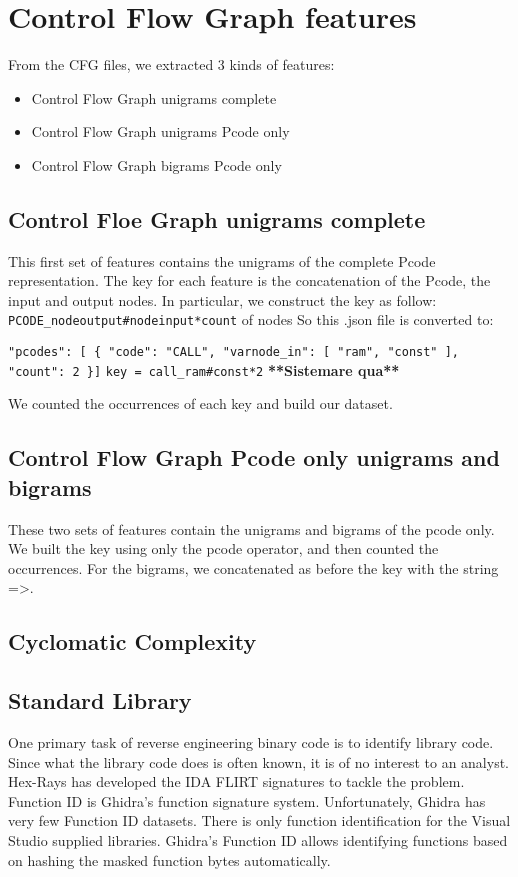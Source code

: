 \section{Control Flow Graph features}
From the CFG files, we extracted 3 kinds of features:
\begin{itemize}
	\item {Control Flow Graph unigrams complete}
	\item {Control Flow Graph unigrams Pcode only}
	\item {Control Flow Graph bigrams Pcode only}
\end{itemize}

\subsection{Control Floe Graph unigrams complete}
This first set of features contains the unigrams of the complete Pcode representation. The key for each feature is the concatenation of the Pcode, the input and output nodes. In particular, we construct the key as follow:
\texttt{PCODE\_nodeoutput\#nodeinput*count} of nodes
So this .json file  is converted to:

\texttt{"pcodes": [
\{
	"code": "CALL",
	"varnode\_in": [
	"ram",
	"const"
	],
	"count": 2
\}]}
\texttt{key = call\_ram\#const*2}
\textbf{**Sistemare qua**}

We counted the occurrences of each key and build our dataset.

\subsection{Control Flow Graph Pcode only unigrams and bigrams}

These two sets of features contain the unigrams and bigrams of the pcode only. We built the key using only the pcode operator, and then counted the occurrences. For the bigrams, we concatenated as before the key with the string =>.

\subsection{Cyclomatic Complexity}


\subsection{Standard Library}

One primary task of reverse engineering binary code is to identify library code. Since what the library code does is often known, it is of no interest to an analyst. Hex-Rays has developed the IDA FLIRT signatures to tackle the problem. Function ID is Ghidra's function signature system. Unfortunately, Ghidra has very few Function ID datasets. There is only function identification for the Visual Studio supplied libraries. Ghidra's Function ID allows identifying functions based on hashing the masked function bytes automatically.\cite{ghidra_fid}\\

